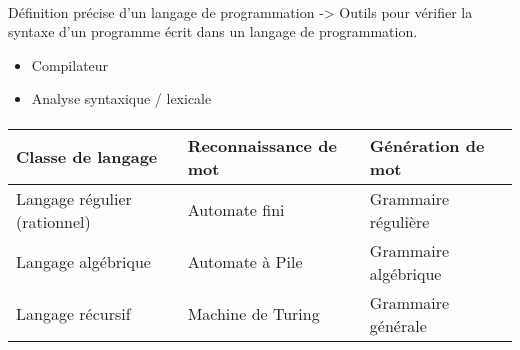 \paragraph{}
Définition précise d'un langage de programmation
-> Outils pour vérifier la syntaxe d'un programme écrit dans un langage de programmation.

\begin{itemize}
	\item Compilateur
	\item Analyse syntaxique / lexicale
\end{itemize}
\paragraph{}
\begin{tabular}{|l|l|l|}
	\hline
	Classe de langage & Reconnaissance de mot & Génération de mot \\
	\hline
	Langage régulier (rationnel) & Automate fini & Grammaire régulière \\
	\hline
	Langage algébrique & Automate à Pile & Grammaire algébrique \\
	\hline
	Langage récursif & Machine de Turing & Grammaire générale \\
	\hline
\end{tabular}

\center
{}
\flushleft